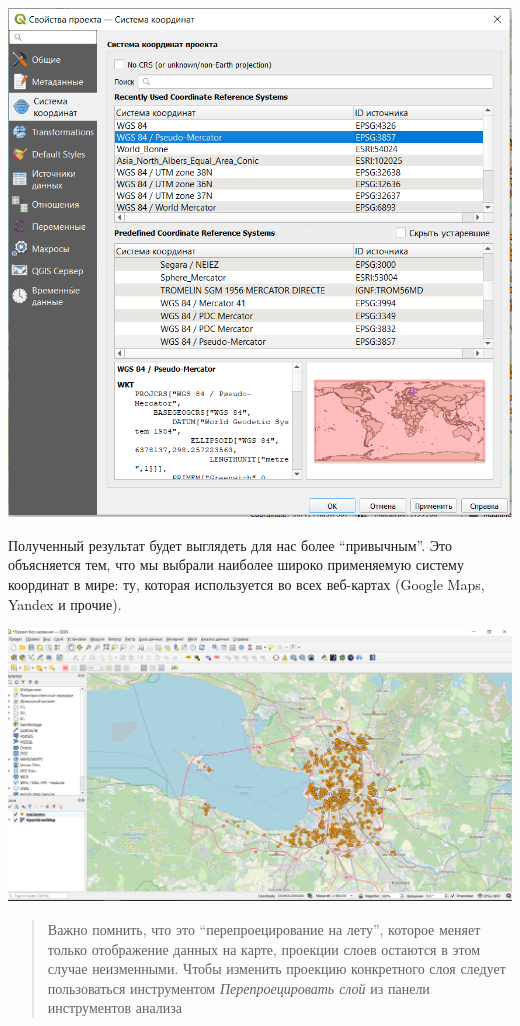 \documentclass[
]{book}
\begin{document}
\includegraphics{figures/6.PNG}

Полученный результат будет выглядеть для нас более ``привычным''. Это объясняется тем, что мы выбрали наиболее широко применяемую систему координат в мире: ту, которая используется во всех веб-картах (Google Maps, Yandex и прочие).

\includegraphics{figures/7.PNG}

\begin{quote}
Важно помнить, что это ``перепроецирование на лету'', которое меняет только отображение данных на карте, проекции слоев остаются в этом случае неизменными. Чтобы изменить проекцию конкретного слоя следует пользоваться инструментом \emph{Перепроецировать слой} из панели инструментов анализа
\end{quote}
\end{document}
